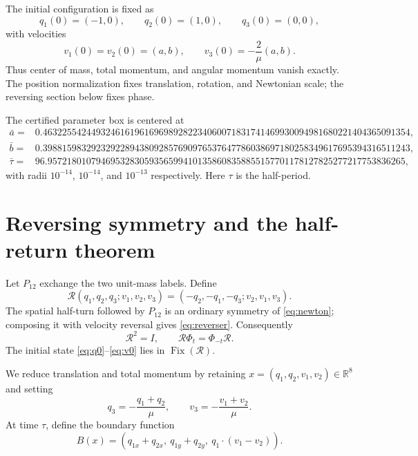 \documentclass[11pt]{article}
\newcommand{\R}{\mathbb{R}}
\newcommand{\PhiFlow}{\Phi}
\begin{document}
The initial configuration is fixed as
\begin{equation}
  q_1(0)=(-1,0),\qquad q_2(0)=(1,0),\qquad q_3(0)=(0,0), \label{eq:q0}
\end{equation}
with velocities
\begin{equation}
  v_1(0)=v_2(0)=(a,b),\qquad
  v_3(0)=-\frac{2}{\mu}(a,b). \label{eq:v0}
\end{equation}
Thus center of mass, total momentum, and angular momentum vanish exactly. The position normalization fixes translation, rotation, and Newtonian scale; the reversing section below fixes phase.

The certified parameter box is centered at
\begin{align}
  \bar a={}&0.4632255424493246161961696989282234060071831741469930094981680221404365091354,\\
  \bar b={}&0.3988159832923292289438092857690976537647786038697180258349617695394316511243,\\
  \bar\tau={}&96.95721801079469532830593565994101358608358855157701178127825277217753836265,
\end{align}
with radii $10^{-14}$, $10^{-14}$, and $10^{-13}$ respectively. Here $\tau$ is the half-period.

\section{Reversing symmetry and the half-return theorem}

Let $P_{12}$ exchange the two unit-mass labels. Define
\begin{equation}
  \mathcal R(q_1,q_2,q_3;v_1,v_2,v_3)
  =(-q_2,-q_1,-q_3;v_2,v_1,v_3). \label{eq:reverser}
\end{equation}
The spatial half-turn followed by $P_{12}$ is an ordinary symmetry of \eqref{eq:newton}; composing it with velocity reversal gives \eqref{eq:reverser}. Consequently
\begin{equation}
  \mathcal R^2=I,\qquad \mathcal R\PhiFlow_t=\PhiFlow_{-t}\mathcal R. \label{eq:reversing}
\end{equation}
The initial state \eqref{eq:q0}--\eqref{eq:v0} lies in $\operatorname{Fix}(\mathcal R)$.

We reduce translation and total momentum by retaining
$x=(q_1,q_2,v_1,v_2)\in\R^8$ and setting
\begin{equation}
  q_3=-\frac{q_1+q_2}{\mu},\qquad
  v_3=-\frac{v_1+v_2}{\mu}. \label{eq:com-reduction}
\end{equation}
At time $\tau$, define the boundary function
\begin{equation}
  B(x)=\left(q_{1x}+q_{2x},\ q_{1y}+q_{2y},\ q_1\mathbin{\cdot}(v_1-v_2)\right). \label{eq:boundary}
\end{equation}
\end{document}

